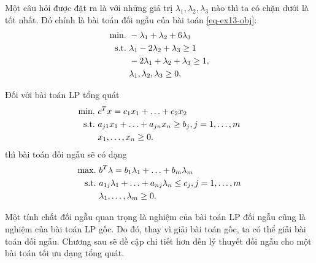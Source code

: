 \documentclass{book}
\begin{document}
Một câu hỏi được đặt ra là với những giá trị $\lambda_1, \lambda_2, \lambda_3$ nào thì ta có chặn dưới là tốt nhất. 
Đó chính là bài toán đối ngẫu của bài toán \eqref{eq-ex13-obj}:
\begin{align*}
\rm{min.}~ & -\lambda_1 +  \lambda_2 + 6\lambda_3\\
\rm{s.t.}~ & \lambda_1 -2 \lambda_2 + \lambda_3 \geq 1 \\
		& - 2 \lambda_1 + \lambda_2 + \lambda_3 \geq 1,\\
		&	\lambda_1,	\lambda_2, \lambda_3 \geq 0.		
\end{align*}

Đối với bài toán LP tổng quát
\begin{align*}
\rm{min.}~ & c^Tx = c_1 x_1 + \ldots + c_2 x_2 \\
\rm{s.t.}~ & a_{j1}x_1+ \ldots + a_{jn}x_n \geq b_j, j=1,\ldots, m\\
		&	x_1, \ldots, x_n \geq 0.
\end{align*}
thì bài toán đối ngẫu sẽ có dạng
\begin{align*}
\rm{max.}~ & b^T \lambda = b_1 \lambda_1 + \ldots + b_m \lambda_m \\
\rm{s.t.}~ & a_{1j}\lambda_1+ \ldots + a_{nj}\lambda_n \leq c_j, j=1,\ldots, m\\
		&	\lambda_1, \ldots, \lambda_m \geq 0.
\end{align*}

Một tính chất đối ngẫu quan trọng là nghiệm của bài toán LP đối ngẫu cũng là nghiệm của bài toán LP gốc. Do đó, thay vì giải bài toán gốc, ta có thể giải bài toán đối ngẫu.
Chương sau sẽ đề cập chi tiết hơn đến lý thuyết đối ngẫu cho một bài toán tối ưu dạng tổng quát.

\end{document}
